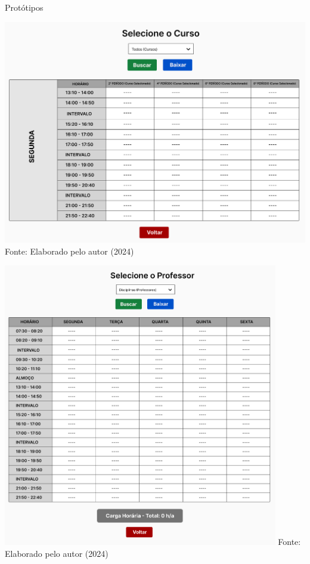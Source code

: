 \begin{frame}{Protótipos}
    \begin{minipage}{0.48\textwidth}
        \centering
        \includegraphics[width=1\textwidth]{figuras/proto-3.png}
        \footnotesize Fonte: Elaborado pelo autor (2024)
    \end{minipage}
    \hfill
    \begin{minipage}{0.48\textwidth}
        \centering
        \includegraphics[width=0.9\textwidth]{figuras/proto-4.png}
        \footnotesize Fonte: Elaborado pelo autor (2024)
    \end{minipage}
\end{frame}

